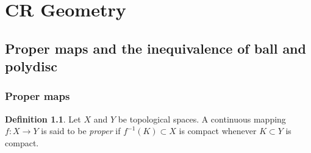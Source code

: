 \documentclass[12pt,openany]{book}
\theoremstyle{plain}
\theoremstyle{remark}
\theoremstyle{definition}
\newtheorem{defn}[thm]{Definition}
\theoremstyle{exercise}
\theoremstyle{example}
\begin{document}
%
%





\chapter{CR Geometry} \label{cr:chapter}


\section{Proper maps and the inequivalence of ball and polydisc} \label{sec:ibp}

\subsection{Proper maps}

\begin{defn}
Let $X$ and $Y$ be topological spaces.  A continuous mapping
$f \colon X \to Y$ is said to be \emph{proper}
if $f^{-1}(K) \subset X$ is compact whenever $K \subset Y$ is compact.
\end{defn}
\end{document}
